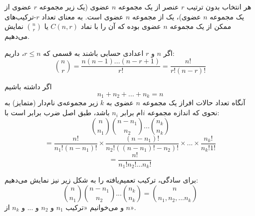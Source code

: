 
\begin{definition}
    هر انتخاب بدون ترتیب
    $r$
    عنصر از یک مجموعه
    $n$
    عضوی
    (یک زیر مجموعه $r$ عضوی از یک مجموعه $n$ عضوی)،
    یک
    از مجموعه
    $n$
    عضوی است.
    به معنای تعداد
    $r$-ترکیب‌های ممکن
    از یک مجموعه $n$ عضوی
    بوده که آن را با نماد 
    $C(n,r)$ یا 
    ${n\choose r}$ نمایش می‌دهیم. 
\end{definition}

\begin{fact}
    اگر $n$ و $r$ اعدادی حسابی باشند به قسمی که 
    $r\leq n$، داریم:
    $${n \choose r} = \frac{n(n-1)...(n-r+1)}{r!} = \frac{n!}{r!(n-r)!}$$
\end{fact}




\begin{fact}
    اگر داشته باشیم
    $$n_{1} + n_{2} + ... + n_{k} = n$$
    آنگاه تعداد حالات افراز یک مجموعه $n$ عضوی
    به $k$ زیر مجموعه‌ی نام‌دار (متمایز) به نحوی که
    اندازه مجموعه
    $i$ام
    برابر $n_{i}$
    باشد، طبق اصل ضرب برابر است با:
    $${n \choose n_{1}} {n-n_{1} \choose n_{2}} ... {n_{k} \choose n_{k}}$$
    $$= \frac{n!}{n_{1}!(n-n_{1})!} \times \frac{(n-n_{1})!}{n_{2}!((n-n_{1})!-n_{2})!} \times ... \times \frac{n_{k}!}{n_{k}!1!}$$
    $$= \frac{n!}{n_{1}!n_{2}! ... n_{k}!}$$
\end{fact}

\begin{definition}
    برای سادگی، ترکیب تعمیم‌یافته را به شکل زیر نیز نمایش می‌دهیم:
    $${n \choose n_{1}} {n-n_{1} \choose n_{2}} ... {n_{k} \choose n_{k}} = {n \choose n_{1},n_{2}, ... n_{k}}$$
    و می‌خوانیم
    «ترکیب $n_1$ و $n_2$ و ... و $n_k$ از $n$».
\end{definition}



